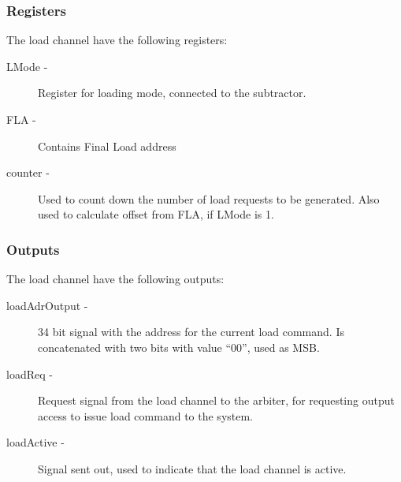 \begin{appendix}
\subsubsection{Registers}
The load channel have the following registers:

\begin{description}
    \item[LMode -]
    Register for loading mode, connected to the subtractor.
    \item[FLA -]
    Contains Final Load address
    \item[counter -]
    Used to count down the number of load requests to be generated. Also used to calculate offset from FLA, if LMode is 1.
\end{description}

\subsubsection{Outputs}
The load channel have the following outputs:

\begin{description}
    \item[loadAdrOutput -]
    34 bit signal with the address for the current load command. Is concatenated with two bits with value ``00'', used as MSB.
    \item[loadReq -]
    Request signal from the load channel to the arbiter, for requesting output access to issue load command to the system.   
    \item[loadActive -]
    Signal sent out, used to indicate that the load channel is active.
\end{description}


\end{appendix}
